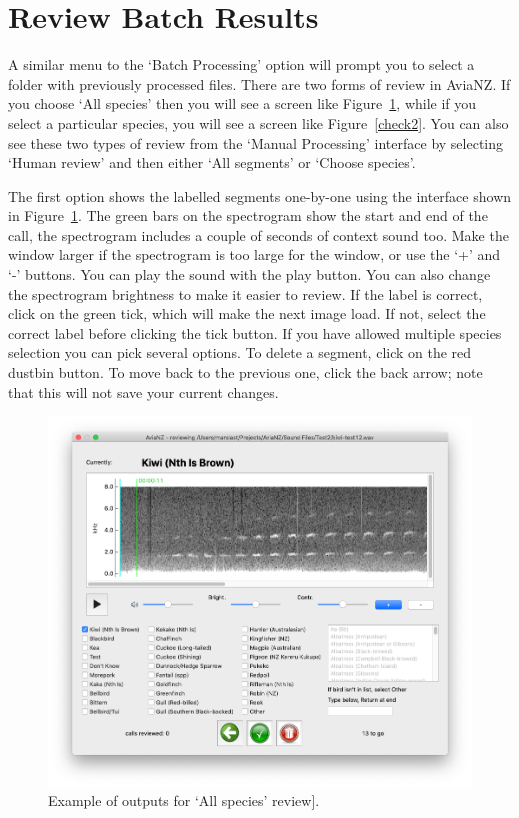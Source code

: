 \documentclass{article}
\begin{document}
\section{Review Batch Results}\label{sec:review}

A similar menu to the `Batch Processing' option will prompt you to select a folder with previously processed files. There are two forms of review in AviaNZ. 
If you choose `All species' then you will see a screen like Figure~\ref{check1}, while if you select a particular species, you will see a screen like Figure~\ref{check2}. You can also see these two types of review from the `Manual Processing' interface by selecting `Human review' and then either `All segments' or `Choose species'. 

The first option shows the labelled segments one-by-one using the interface shown in Figure~\ref{check1}. 
The green bars on the spectrogram show the start and end of the call, the spectrogram includes a couple of seconds of context sound too. Make the window larger if the spectrogram is too large for the window, or use the `+' and `-' buttons. You can play the sound with the play button. You can also change the spectrogram brightness to make it easier to review. If the label is correct, click on the green tick, which will make the next image load. If not, select the correct label before clicking the tick button. If you have allowed multiple species selection you can pick several options. To delete a segment, click on the red dustbin button. To move back to the previous one, click the back arrow; note that this will not save your current changes. 

	\begin{figure}
	\centering
	\includegraphics[width=.6\textwidth]{Figs/review1}
	\caption{Example of outputs for `All species' review].}
	\label{check1}
	\end{figure}
	
\end{document}
